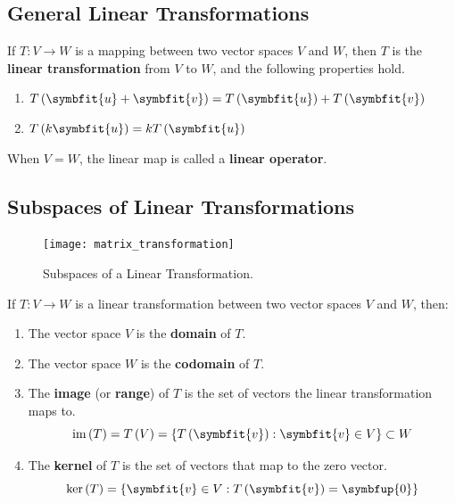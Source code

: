 \documentclass{article}
\begin{document}
\subsection{General Linear Transformations}
\begin{theorem}
    If \(T: V \rightarrow W\) is a mapping between two vector spaces
    \(V\) and \(W\), then \(T\) is the \textbf{linear transformation}
    from \(V\) to \(W\), and the following properties hold.
    \begin{enumerate}
        \item \(T\left(\symbfit{u}+\symbfit{v}\right)=T\left(\symbfit{u}\right) + T\left(\symbfit{v}\right)\)
        \item \(T\left(k\symbfit{u}\right) = kT\left(\symbfit{u}\right)\)
    \end{enumerate}
\end{theorem}
\begin{theorem}
    When \(V=W\), the linear map is called a \textbf{linear operator}.
\end{theorem}
\subsection{Subspaces of Linear Transformations}
\begin{figure}[H]
    \centering
    \texttt{[image: matrix\_transformation]}
    \caption{Subspaces of a Linear Transformation.}
\end{figure}
\begin{definition}
    If \(T:V \rightarrow W\) is a linear transformation between two
    vector spaces \(V\) and \(W\), then:
    \begin{enumerate}
        \item The vector space \(V\) is the \textbf{domain} of \(T\).
        \item The vector space \(W\) is the \textbf{codomain} of \(T\).
        \item The \textbf{image} (or \textbf{range}) of \(T\) is the set
              of vectors the linear transformation maps to.
              \begin{equation*}
                  \vim{\left( T \right)} = T\left(V\right) = \left\{ T\left(\symbfit{v}\right) : \symbfit{v}\in V \right\} \subset W
              \end{equation*}
        \item The \textbf{kernel} of \(T\) is the set of vectors that
              map to the zero vector.
              \begin{equation*}
                  \vker{\left( T \right)} = \left\{ \symbfit{v}\in V : T\left(\symbfit{v}\right)=\symbfup{0} \right\}
              \end{equation*}
    \end{enumerate}
\end{definition}
\end{document}
